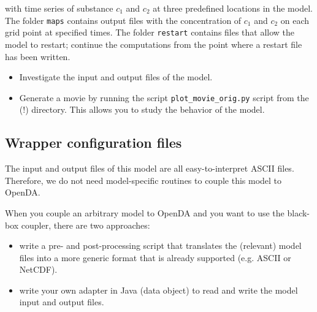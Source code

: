 with time series
of substance $c_1$ and $c_2$ at three predefined locations in the model. The
folder {\tt maps} contains output files with the concentration of $c_1$ and $c_2$ on each grid point at specified times.
The folder {\tt restart} contains files that allow the model to restart; continue the computations from the point where a restart file has been written.
\begin{itemize}
	\item Investigate the input and output files of the model. 
	\item Generate a movie by running the script {\tt plot\_movie\_orig.py} script from the {\tt { \opgave}} (!) directory. This allows you  to study the behavior of the model. 
\end{itemize}

\subsection{Wrapper configuration files}

The input and output files of this model are all easy-to-interpret ASCII files. 
Therefore, we do not need model-specific routines to couple this model to OpenDA.

When you couple an arbitrary model to OpenDA and you want to use the black-box coupler, there are two approaches:
\begin{itemize}
	\item write a pre- and post-processing script that translates the (relevant)
	      model files into a more generic format that is already supported
	      (e.g. ASCII or NetCDF).
	\item write your own adapter in Java (data object) to read and write the
	      model input and output files.
\end{itemize}

